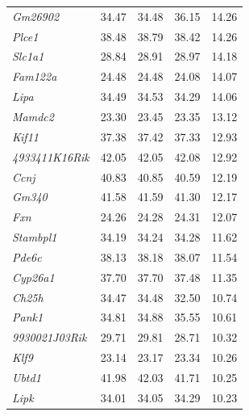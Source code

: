 \documentclass[oneside]{book}\usepackage[]{graphicx}\usepackage[]{color}
\begin{document}
\begin{appendices}
\begin{table}[ht]
\begin{tabular}{>{\em}lrrrr}
  Gm26902 & 34.47 & 34.48 & 36.15 & 14.26 \\
  Plce1 & 38.48 & 38.79 & 38.42 & 14.26 \\
  Slc1a1 & 28.84 & 28.91 & 28.97 & 14.18 \\
  Fam122a & 24.48 & 24.48 & 24.08 & 14.07 \\
  Lipa & 34.49 & 34.53 & 34.29 & 14.06 \\
  Mamdc2 & 23.30 & 23.45 & 23.35 & 13.12 \\
  Kif11 & 37.38 & 37.42 & 37.33 & 12.93 \\
  4933411K16Rik & 42.05 & 42.05 & 42.08 & 12.92 \\
  Ccnj & 40.83 & 40.85 & 40.59 & 12.19 \\
  Gm340 & 41.58 & 41.59 & 41.30 & 12.17 \\
  Fxn & 24.26 & 24.28 & 24.31 & 12.07 \\
  Stambpl1 & 34.19 & 34.24 & 34.28 & 11.62 \\
  Pde6c & 38.13 & 38.18 & 38.07 & 11.54 \\
  Cyp26a1 & 37.70 & 37.70 & 37.48 & 11.35 \\
  Ch25h & 34.47 & 34.48 & 32.50 & 10.74 \\
  Pank1 & 34.81 & 34.88 & 35.55 & 10.61 \\
  9930021J03Rik & 29.71 & 29.81 & 28.71 & 10.32 \\
  Klf9 & 23.14 & 23.17 & 23.34 & 10.26 \\
  Ubtd1 & 41.98 & 42.03 & 41.71 & 10.25 \\
  Lipk & 34.01 & 34.05 & 34.29 & 10.23 \\
   \hline
\end{tabular}
\endgroup
\end{table}


\end{appendices}
\end{document}
